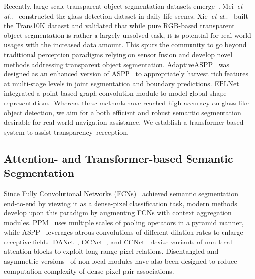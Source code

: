 \documentclass[journal]{IEEEtran}
\makeatletter
\DeclareRobustCommand\onedot{\futurelet\@let@token\@onedot}
\def\@onedot{\ifx\@let@token.\else.\null\fi\xspace}
\def\etal{\emph{et al}\onedot}
\makeatother
\begin{document}
Recently, large-scale transparent object segmentation datasets emerge~\cite{mei2020don,xie2021segmenting,okazawa2019simultaneous,xiang2021polarization,xie2020segmenting}. Mei~\etal~\cite{mei2020don} constructed the glass detection dataset in daily-life scenes. Xie~\etal~\cite{xie2021segmenting,xie2020segmenting} built the Trans10K dataset and validated that while pure RGB-based transparent object segmentation is rather a largely unsolved task, it is potential for real-world usages with the increased data amount. This spurs the community to go beyond traditional perception paradigms relying on sensor fusion and develop novel methods addressing transparent object segmentation. AdaptiveASPP~\cite{fakemix} was designed as an enhanced version of ASPP~\cite{deeplabv3+} to appropriately harvest rich features at multi-stage levels in joint segmentation and boundary predictions. EBLNet~\cite{enhanced_boundary_learning} integrated a point-based graph convolution module to model global shape representations. Whereas these methods have reached high accuracy on glass-like object detection, we aim for a both efficient and robust semantic segmentation desirable for real-world navigation assistance. We establish a transformer-based system to assist transparency perception.

\subsection{Attention- and Transformer-based Semantic Segmentation}
Since Fully Convolutional Networks (FCNs)~\cite{fcn} achieved semantic segmentation end-to-end by viewing it as a dense-pixel classification task, modern methods develop upon this paradigm by augmenting FCNs with context aggregation modules. PPM~\cite{pspnet} uses multiple scales of pooling operators in a pyramid manner, while ASPP~\cite{deeplabv3+} leverages atrous convolutions of different dilation rates to enlarge receptive fields. DANet~\cite{danet}, OCNet~\cite{ocnet}, and CCNet~\cite{ccnet} devise variants of non-local attention blocks to exploit long-range pixel relations. Disentangled and asymmetric versions~\cite{yin2020disentangled,zhu2019asymmetric,yang2021capturing} of non-local modules have also been designed to reduce computation complexity of dense pixel-pair associations.
\end{document}
